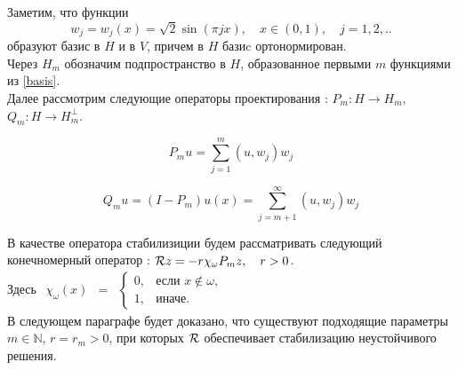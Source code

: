 \vspace{2em}

Заметим, что функции
\begin{equation}\label{basis}
	w_j = w_j(x) = \sqrt{2}\sin{(\pi j x)}, \quad x \in (0, 1), \quad j=1, 2, ..
\end{equation}
образуют базис в $H$ и в $V$, причем в $H$ базиc ортонормирован.\\
Через $H_m$ обозначим подпространство в $H$, образованное первыми $m$ функциями из \eqref{basis}.\\
Далее рассмотрим следующие операторы проектирования : $P_m : H \rightarrow H_m$, $Q_m : H \rightarrow H_m^{\perp}$.

\begin{equation}
	P_m u = \sum \limits_{j=1}^{m} {(u, w_j) w_j}
\end{equation}

\begin{equation}
	Q_m u = (I - P_m)u(x) = \sum \limits_{j=m + 1}^{\infty} {(u, w_j) w_j}
\end{equation}

В качестве оператора стабилизиции будем рассматривать следующий конечномерный оператор :
$\mathcal{R}{z} = -r\chi_{\omega}P_mz, \quad r > 0$.\\
Здесь $
    \begin{matrix}
    \chi_{\omega}(x) & =
    & \left\{
    \begin{matrix}
    0, & \mbox{если } x \notin \omega, \\
    1, & \mbox{иначе. }
    \end{matrix} \right.
    \end{matrix}
$\\

В следующем параграфе будет доказано, что существуют подходящие параметры $m \in \mathbb{N}$, $r = r_m > 0$, при которых $\mathcal{R}{}$ обеспечивает стабилизацию неустойчивого решения.

